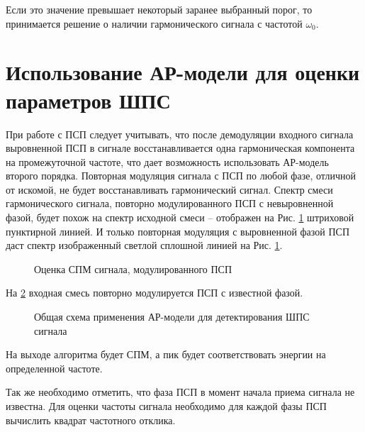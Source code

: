 Если это значение превышает некоторый заранее выбранный порог, то принимается решение о наличии гармонического
сигнала с частотой ${\omega_0}$. 

\section{Использование АР-модели для оценки параметров ШПС}

При работе с ПСП следует учитывать, что после демодуляции входного сигнала выровненной ПСП в сигнале восстанавливается одна гармоническая
компонента на промежуточной частоте, что дает возможность использовать АР-модель второго порядка.
Повторная модуляция сигнала с ПСП по любой фазе, отличной от искомой, не будет восстанавливать гармонический сигнал.
Спектр смеси гармонического сигнала, повторно модулированного ПСП с невыровненной фазой, будет похож на спектр исходной смеси – отображен
на Рис. \ref{pic:lpc_psd_1} штриховой пунктирной линией. И только повторная модуляция с выровненной фазой ПСП даст спектр
изображенный светлой сплошной линией на Рис. \ref{pic:lpc_psd_1}.
\begin{figure}[h]
	\center{}
	\caption{Оценка СПМ сигнала, модулированного ПСП}
	\label{pic:lpc_psd_1}
\end{figure}

На \ref{pic:lpc_basic1} входная смесь повторно модулируется ПСП с известной фазой.
\begin{figure}[h]
	\center{}
	\caption{Общая схема применения АР-модели для детектирования ШПС сигнала}
	\label{pic:lpc_basic1}
\end{figure}

На выходе алгоритма будет СПМ, а пик будет соответствовать энергии на определенной частоте.


Так же необходимо отметить, что фаза ПСП в момент начала приема сигнала не известна.
Для оценки частоты сигнала необходимо для каждой фазы ПСП вычислить квадрат частотного
отклика.

